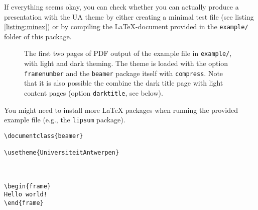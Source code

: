 If everything seems okay, you can check whether you can actually produce a presentation with the UA theme by either creating a minimal test file (see listing \ref{listing:minex}) or by compiling the \LaTeX-document provided in the \lstinline!example/! folder of this package. 


\begin{figure}
\centering
\setlength{\figurewidth}{6cm}


\caption{The first two pages of PDF output of the example file in \lstinline!example/!, with light and dark theming. The theme is loaded with the option \lstinline!framenumber! and the \texttt{beamer} package itself with \lstinline!compress!. Note that it is also possible the combine the dark title page with light content pages (option \lstinline!darktitle!, see below).}
\label{fig:example1}
\end{figure}

\begin{note}
You might need to install more \LaTeX{} packages when running the provided example file (e.g., the \texttt{lipsum} package).
\end{note}

\begin{lstlisting}[float,caption={A minimalistic test file for the UA Beamer theme.},captionpos=b,label=listing:minex,abovecaptionskip=\bigskipamount]
\documentclass{beamer}

\usetheme{UniversiteitAntwerpen}



\begin{frame}
Hello world!
\end{frame}


\end{lstlisting}
